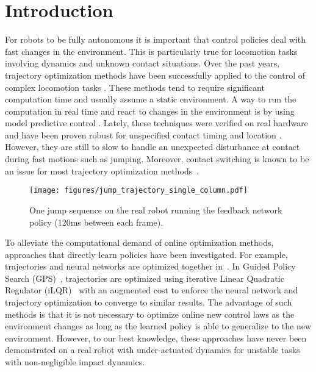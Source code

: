 

\section{Introduction}
%
For robots to be fully autonomous it is important that control policies deal with fast changes in the environment. This is particularly true for locomotion tasks involving dynamics and unknown contact situations.
%
Over the past years, trajectory optimization methods have been successfully applied to the control of complex locomotion tasks \cite{PosaT12,tassa2014control,Herzog-2016b,mastalli2016hierarchical}. These methods tend to require significant computation time and usually assume a static environment. A way to run the computation in real time and react to changes in the environment is by using model predictive control \cite{erez2013integrated,koenemann2015whole}. Lately, these techniques were verified on real hardware and have been proven robust for unspecified contact timing and location \cite{neunert2017whole}. However, they are still to slow to handle an unexpected disturbance at contact during fast motions such as jumping. Moreover, contact switching is known to be an issue for most trajectory optimization methods~\cite{posa2016optimization}.
\begin{figure}[th]
    \centering
       \texttt{[image: figures/jump\_trajectory\_single\_column.pdf]}
    \caption{One jump sequence on the real robot running the feedback network policy (120ms between each frame).}
    \label{fig:fig:jump_traj_single}
    \vspace{-0.5cm}
\end{figure}

To alleviate the computational demand of online optimization methods, approaches that directly learn policies have been investigated.
For example, trajectories and neural networks are optimized together in~\cite{mordatch2014combining}. In Guided Policy Search (GPS)~\cite{levine2013guided}, trajectories are optimized using iterative Linear Quadratic Regulator (iLQR)~\cite{li2004iterative} with an augmented cost to enforce the neural network and trajectory optimization to converge to similar results.
The advantage of such methods is that it is not necessary to optimize online new control laws as the environment changes as long as the learned policy is able to generalize to the new environment.
However, to our best knowledge, these approaches have never been demonstrated on a real robot with under-actuated dynamics for unstable tasks with non-negligible impact dynamics.


